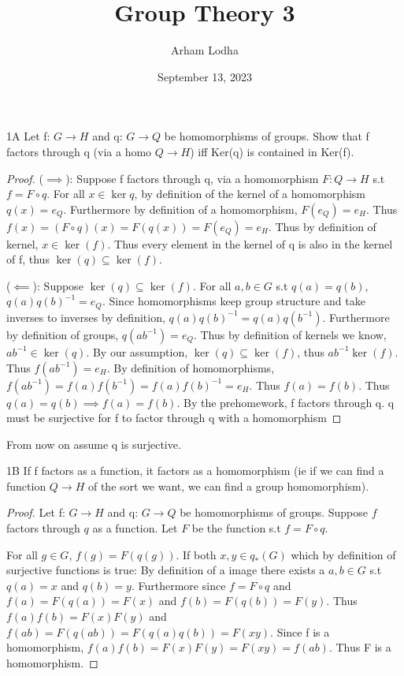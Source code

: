 \documentclass{article}
\begin{document}
\title{Group Theory 3}
\author{Arham Lodha}%
\date{September 13, 2023}%
\maketitle

\begin{claim}{1A}
    Let f: $G\to H$ and q: $G \to Q$ be homomorphisms of groups.
    Show that f factors through q (via a homo $Q \to H$) iff Ker(q) is contained in Ker(f).
\end{claim}
\begin{proof}
    ($\implies$): Suppose f factors through q, via a homomorphism $F: Q \to H$ s.t $f = F \circ q$. For all $x \in \ker q$, by definition of the kernel of a homomorphism $q(x) = e_Q$. Furthermore by definition of a homomorphism, $F(e_Q) = e_H$. Thus $f(x) = (F \circ q)(x) = F(q(x)) = F(e_Q) = e_H$. Thus by definition of kernel, $x \in \ker (f)$. Thus every element in the kernel of q is also in the kernel of f, thus $\ker(q) \subseteq \ker(f)$.

    ($\impliedby$): Suppose $\ker(q) \subseteq \ker(f)$. For all $a, b \in G$ s.t $q(a) = q(b)$, $q(a)q(b)^{-1} = e_Q$. Since homomorphisms keep group structure and take inverses to inverses by definition, $q(a)q(b)^{-1} = q(a)q(b^{-1})$. Furthermore by definition of groups, $q(ab^{-1})=e_Q$. Thus by definition of kernels we know, $ab^{-1} \in \ker(q)$. By our assumption, $\ker(q) \subseteq \ker(f)$, thus $ab^{-1} \ker(f)$. Thus $f(ab^{-1}) = e_H$. By definition of homomorphisms, $f(ab^{-1}) = f(a)f(b^{-1}) = f(a)f(b)^{-1} = e_H$. Thus $f(a) = f(b)$. Thus $q(a) = q(b) \implies f(a) = f(b)$. By the prehomework, f factors through q. q must be surjective for f to factor through q with a homomorphism
\end{proof}

From now on assume q is surjective.
\bigskip
\begin{claim}{1B}
    If f factors as a function, it factors as a homomorphism (ie if we can find a function $Q \to H$ of the sort we want, we can find a group homomorphism). 
\end{claim}
\begin{proof}
    Let f: $G\to H$ and q: $G \to Q$ be homomorphisms of groups. Suppose $f$ factors through $q$ as a function. Let $F$ be the function s.t $f = F \circ q$. 
    
    For all $g \in G$, $f(g) = F(q(g))$. If both $x, y \in q_*(G)$ which by definition of surjective functions is true: By definition of a image there exists a $a, b \in G$ s.t $q(a) = x$ and $q(b) = y$. Furthermore since $f = F \circ q$ and $f(a) = F(q(a)) = F(x)$ and $f(b) = F(q(b)) = F(y)$. Thus $f(a)f(b) = F(x)F(y)$ and $f(ab) = F(q(ab)) = F(q(a)q(b)) = F(xy)$. Since f is a homomorphism, $f(a)f(b) = F(x)F(y) = F(xy) = f(ab)$. Thus F is a homomorphism.
\end{proof}
\end{document}

